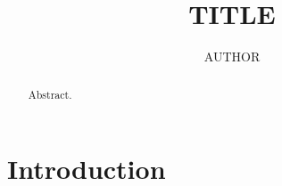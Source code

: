 \documentclass[11pt]{amsproc}
\theoremstyle{plain}
\theoremstyle{definition}
\theoremstyle{remark}
\begin{document}
\title{{{TITLE}}}
\author{{{AUTHOR}}}
\address{Department of Mathematics, University}
\begin{abstract}
Abstract.
\end{abstract}
\maketitle
\section{Introduction}


\end{document}
